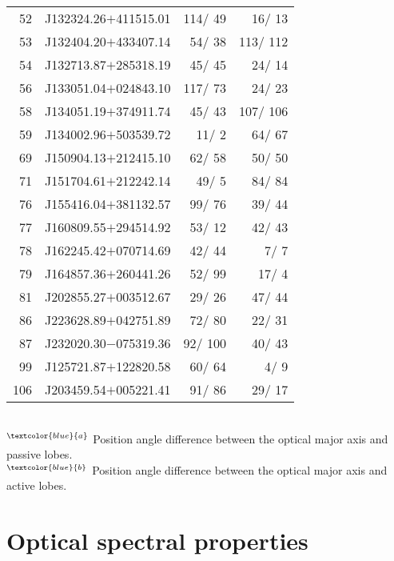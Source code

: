 \documentclass[twocolumn]{aastex62}
\begin{document}
\begin{table}
\begin{minipage}{85mm}
{\begin{tabular}{@{} r c r  r  @{}}
 52   &J132324.26$+$411515.01 &     114/  49    &      16/   13   \\ 
 53   &J132404.20$+$433407.14 &      54/  38    &     113/  112   \\ 
 54   &J132713.87$+$285318.19 &      45/  45    &      24/   14   \\ 
 56   &J133051.04$+$024843.10 &     117/  73    &      24/   23   \\ 
 58   &J134051.19$+$374911.74 &      45/  43    &     107/  106   \\ 
 59   &J134002.96$+$503539.72 &      11/   2    &      64/   67   \\ 
 69   &J150904.13$+$212415.10 &      62/  58    &      50/   50   \\ 
 71   &J151704.61$+$212242.14 &      49/   5    &      84/   84   \\ 
 76   &J155416.04$+$381132.57 &      99/  76    &      39/   44   \\ 
 77   &J160809.55$+$294514.92 &      53/  12    &      42/   43   \\ 
 78   &J162245.42$+$070714.69 &      42/  44    &       7/    7   \\ 
 79   &J164857.36$+$260441.26 &      52/  99    &      17/    4   \\ 
 81   &J202855.27$+$003512.67 &      29/  26    &      47/   44   \\ 
 86   &J223628.89$+$042751.89 &      72/  80    &      22/   31   \\ 
 87   &J232020.30$-$075319.36 &      92/  100   &      40/   43   \\ 
 99   &J125721.87$+$122820.58 &      60/  64    &       4/    9   \\ 
106   &J203459.54$+$005221.41 &      91/  86    &      29/   17   \\ 
                     
\hline               
 \end{tabular}       
 }  \\          
    $^{\textcolor{blue}{a}}$ Position angle difference between the optical major axis and passive lobes. \\
    $^{\textcolor{blue}{b}}$ Position angle difference between the optical major axis and active lobes. \\

                                   
 \end{minipage}
 \end{table}  
  
\section{Optical spectral properties} 
\end{document}
